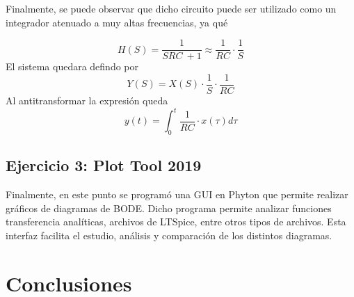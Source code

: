 \documentclass[a4paper]{article}
\begin{document}
Finalmente, se puede observar que dicho circuito puede ser utilizado como un integrador atenuado a muy altas frecuencias, ya qué

\begin{equation}
	H \left(S \right) = \frac{1}{SRC \ + 1} \approx \frac{1}{RC} \cdot \frac{1}{S}
\end{equation}
El sistema quedara defindo por 
\begin{equation}
	Y \left(S \right) = X \left(S \right) \cdot \frac{1}{S} \cdot \frac{1}{RC}
\end{equation}
Al antitransformar la expresión queda 
\begin{equation}
	y \left(t \right)=\int_{0}^{t} \frac{1}{RC}\cdot x(\tau) d\tau
\end{equation}
\subsection{Ejercicio 3: Plot Tool 2019}
Finalmente, en este punto se programó una GUI en Phyton que permite realizar gráficos de diagramas de BODE. Dicho programa permite analizar funciones transferencia analíticas, archivos de LTSpice, entre otros tipos de archivos. Esta interfaz facilita el estudio, análisis y comparación de los distintos diagramas.

\section{Conclusiones}
\end{document}

